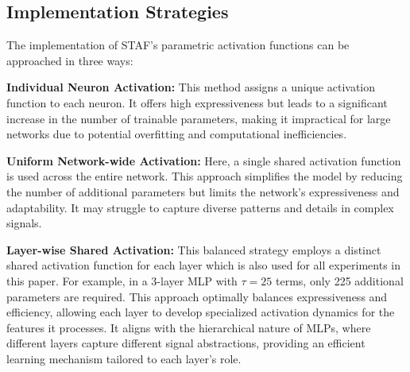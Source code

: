 \subsection{Implementation Strategies} 
\label{sec:implement_str}
The implementation of STAF's parametric activation functions can be approached in three ways:

 \textbf{Individual Neuron Activation:} This method assigns a unique activation function to each neuron. It offers high expressiveness but leads to a significant increase in the number of trainable parameters, making it impractical for large networks due to potential overfitting and computational inefficiencies.

 \textbf{Uniform Network-wide Activation:} Here, a single shared activation function is used across the entire network. This approach simplifies the model by reducing the number of additional parameters but limits the network's expressiveness and adaptability. It may struggle to capture diverse patterns and details in complex signals.

 \textbf{Layer-wise Shared Activation:} This balanced strategy employs a distinct shared activation function for each layer which is also used for all experiments in this paper. For example, in a 3-layer MLP with $\tau=25$ terms, only 225 additional parameters are required. This approach optimally balances expressiveness and efficiency, allowing each layer to develop specialized activation dynamics for the features it processes. It aligns with the hierarchical nature of MLPs, where different layers capture different signal abstractions, providing an efficient learning mechanism tailored to each layer's role.

